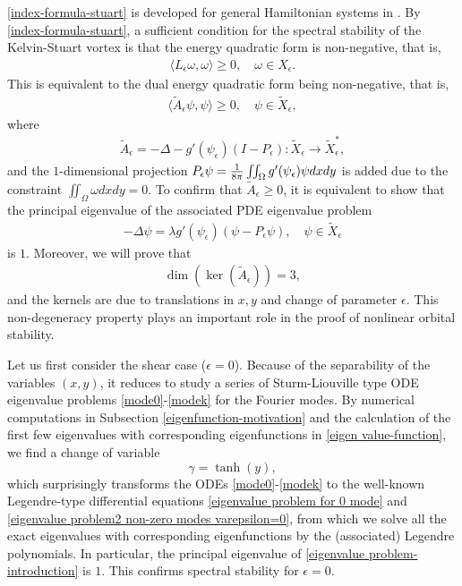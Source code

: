 \documentclass[1 [leqno, 11pt]{amsart}
\numberwithin{equation}{section}
\let\ep=\epsilon
\begin{document}
\begin{CJK*}{GBK}{song}
\eqref{index-formula-stuart} is developed   for general Hamiltonian systems   in \cite{lin2022instability}.
By  \eqref{index-formula-stuart}, a sufficient condition for the spectral stability of the Kelvin-Stuart vortex is that
the energy quadratic form is non-negative, that is,
\begin{align*}
\langle L_\epsilon\omega,\omega\rangle\geq0,\quad\omega\in  X_\ep.
\end{align*}
This is equivalent to  the dual energy quadratic form being non-negative, that is,
 \begin{align}\label{dual energy quadratic form non-negative}
 \langle\tilde A_\epsilon\psi,\psi\rangle\geq0,\quad \psi\in \tilde{X}_\ep,
 \end{align}
where
    \begin{align*}
 \tilde{A}_\ep=-\Delta-g'(\psi_\ep)(I - P_\ep): \tilde{X}_\ep \rightarrow \tilde{X}_\ep^*,
\end{align*}
and the $1$-dimensional projection $P_\ep \psi={1\over8\pi}\iint_\Omega g'(\psi_\ep)\psi dxdy$ is added due to the constraint $\iint_\Omega\omega dxdy=0$.
To confirm that $\tilde A_\epsilon\geq0$, it is equivalent to show that the principal eigenvalue of the associated  PDE eigenvalue problem
\begin{align}\label{eigenvalue problem-introduction}
-\Delta \psi = \lambda g'(\psi_\ep)(\psi -  P_\ep\psi), \quad \psi \in \tilde{X}_\ep
\end{align}
is $1$. Moreover, we will prove that
 \begin{align}\label{dual energy quadratic form ker}
 \dim(\ker(\tilde A_\epsilon))=3,
 \end{align}
and the kernels are due to translations in $x, y$ and change of parameter $\ep$. This non-degeneracy  property plays an important role in the proof of nonlinear orbital stability.

Let us first consider the shear case ($\ep=0$). Because of the separability of the variables $(x,y)$,
 it reduces to study a series of  Sturm-Liouville type ODE eigenvalue problems \eqref{mode0}-\eqref{modek} for the Fourier modes. By numerical computations in Subsection \ref{eigenfunction-motivation} and the calculation of the first few eigenvalues with corresponding eigenfunctions in \eqref{eigen value-function}, we find a change of variable $$\gamma = \tanh(y),$$ which surprisingly transforms the ODEs \eqref{mode0}-\eqref{modek}  to the well-known  Legendre-type differential  equations \eqref{eigenvalue problem for 0 mode} and \eqref{eigenvalue problem2 non-zero modes varepsilon=0}, from which we solve all the exact eigenvalues with corresponding eigenfunctions by the (associated) Legendre polynomials.
 In particular,
 the principal eigenvalue of \eqref{eigenvalue problem-introduction} is $1$.
 This confirms spectral stability for $\ep=0$.


\end{CJK*}
\end{document}

